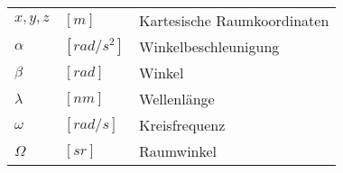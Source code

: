 \begin{tabular}{|m{2.5cm} m{2.5cm} m{8cm}|}
    $x,y,z$                 & $[m]$                    & Kartesische Raumkoordinaten     \\ [1cm]
    $\alpha$                & $[rad/s^2]$              & Winkelbeschleunigung            \\
    $\beta $                & $[rad]$                  & Winkel                          \\
    $\lambda $              & $[nm]$                   & Wellenlänge                     \\
    $\omega $               & $[rad/s]$                & Kreisfrequenz                   \\
    $\Omega $               & $[sr]$                   & Raumwinkel                      \\
\end{tabular}

